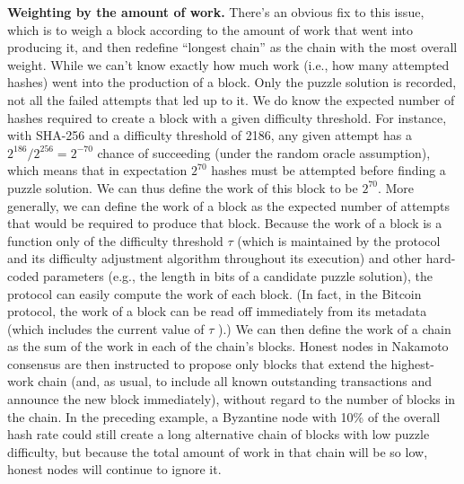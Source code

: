 \noindent
\textbf{Weighting by the amount of work.} There’s an obvious fix to this issue, which is to
weigh a block according to the amount of work that went into producing it, and then
redefine “longest chain” as the chain with the most overall weight. While we can’t know
exactly how much work (i.e., how many attempted hashes) went into the production of a
block. Only the puzzle solution is recorded, not all the failed attempts that led up to it. We
do know the expected number of hashes required to create a block with a given difficulty
threshold. For instance, with SHA-256 and a difficulty threshold of 2186, any given attempt
has a $2^{186}/2^{256} = 2^{-70}$ chance of succeeding (under the random oracle assumption), which
means that in expectation $2^{70}$ hashes must be attempted before finding a puzzle solution.
We can thus define the work of this block to be $2^{70}$. More generally, we can define the work of a block as the expected number of attempts that would be required to produce that
block. Because the work of a block is a function only of the difficulty threshold $\tau$ (which is
maintained by the protocol and its difficulty adjustment algorithm throughout its execution)
and other hard-coded parameters (e.g., the length in bits of a candidate puzzle solution), the
protocol can easily compute the work of each block. (In fact, in the Bitcoin protocol, the work of a block can be read off immediately from its metadata
(which includes the current value of $\tau$ ).) We can then define the work of a chain
as the sum of the work in each of the chain’s blocks. Honest nodes in Nakamoto consensus
are then instructed to propose only blocks that extend the highest-work chain (and, as usual,
to include all known outstanding transactions and announce the new block immediately),
without regard to the number of blocks in the chain. In the preceding example, a Byzantine
node with 10\% of the overall hash rate could still create a long alternative chain of blocks
with low puzzle difficulty, but because the total amount of work in that chain will be so low,
honest nodes will continue to ignore it.\\

